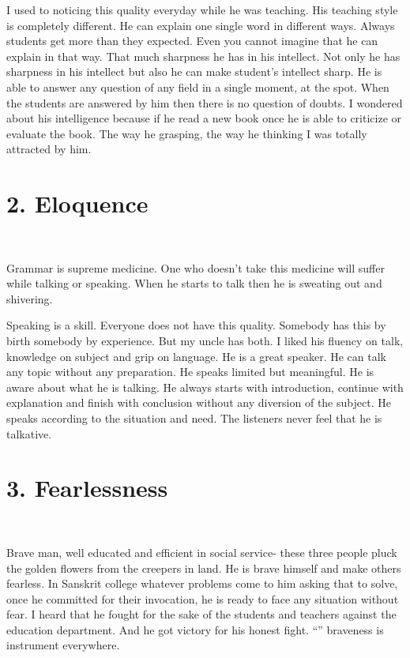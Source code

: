 I used to noticing this quality everyday while he was teaching. His teaching style is completely different. He can explain one single word in different ways. Always students get more than they expected. Even you cannot imagine that he can explain in that way. That much sharpness he has in his intellect. Not only he has sharpness in his intellect but also he can make student’s intellect sharp.  He is able to answer any question of any field in a single moment, at the spot. When the students are answered by him then there is no question of doubts. I wondered about his intelligence because if he read a new book once he is able to criticize or evaluate the book. The way he grasping, the way he thinking I was totally attracted by him.

\section*{2. Eloquence }
\begin{center}
{\fontsize{15}{17}\selectfont
{}\\
}
\end{center}
Grammar is supreme medicine. One who doesn’t take this medicine will suffer while talking or speaking. When he starts to talk then he is sweating out and shivering.

Speaking is a skill. Everyone does not have this quality. Somebody has this by birth somebody by experience. But my uncle has both. I liked his fluency on talk, knowledge on subject and grip on language. He is a great speaker. He can talk any topic without any preparation. He speaks limited but meaningful. He is aware about what he is talking. He always starts with introduction, continue with explanation and finish with conclusion without any diversion of the subject. He speaks according to the situation and need. The listeners never feel that he is talkative.

\section*{3. Fearlessness }
\begin{center}
{\fontsize{15}{17}\selectfont
{}\\
}
\end{center}
Brave man, well educated and efficient in social service- these three people pluck the golden flowers from the creepers in land.
He is brave himself and make others fearless. In Sanskrit college whatever problems come to him asking that to solve, once he committed for their invocation, he is ready to face any situation without fear. I heard that he fought for the sake of the students and teachers against the education department. And he got victory for his honest fight. “” braveness is instrument everywhere.

